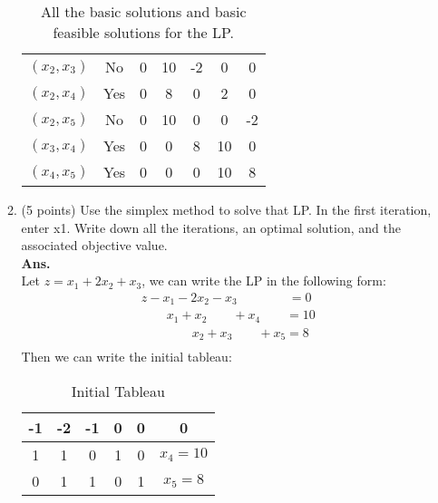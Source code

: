 \documentclass[12pt]{article}
\begin{document}
\begin{enumerate}
\begin{enumerate}
\begin{table}[H]
\begin{tabular}{|c|c|c|c|c|c|c|}
                          $(x_2,x_3)$ & No       & 0     & 10    & -2    & 0     & 0     \\
                          $(x_2,x_4)$ & Yes      & 0     & 8     & 0     & 2     & 0     \\
                          $(x_2,x_5)$ & No       & 0     & 10    & 0     & 0     & -2    \\
                          $(x_3,x_4)$ & Yes      & 0     & 0     & 8     & 10    & 0     \\
                          $(x_4,x_5)$ & Yes      & 0     & 0     & 0     & 10    & 8     \\
                          \hline
                      \end{tabular}
                      \caption{All the basic solutions and basic feasible solutions for the LP.}
                  \end{table}
            \item (5 points) Use the simplex method to solve that LP. In the first iteration, enter x1. Write down all the iterations, an optimal solution, and the associated objective value.\\
                  \textbf{Ans. }\\
                  Let $z = x_1 + 2x_2 + x_3$, we can write the LP in the following form:
                  \begin{align*}
                      z- x_1 - 2x_2 - x_3 \quad\quad\quad\quad =0           \\
                      \quad\quad x_1 + x_2  \quad\quad +x_4 \quad\quad = 10 \\
                      \quad\quad\quad \quad x_2 + x_3 \quad \quad +x_5 = 8  \\
                  \end{align*}
                  Then we can write the initial tableau:
                  \begin{table}[H]
                      \centering
                      \begin{tabular}{ccccc|c}
                          -1 & -2 & -1 & 0 & 0 & 0          \\
                          \hline
                          1  & 1  & 0  & 1 & 0 & $x_4 = 10$ \\
                          0  & 1  & 1  & 0 & 1 & $x_5 = 8$  \\
                      \end{tabular}
                      \caption{Initial Tableau}
                  \end{table}

\end{enumerate}
\end{enumerate}
\end{document}
